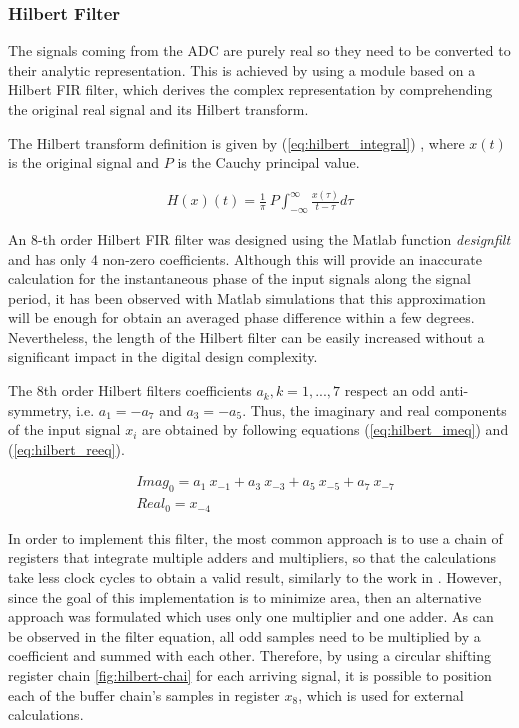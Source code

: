 \subsubsection{Hilbert Filter}

The signals coming from the ADC are purely real so they need to be converted to their analytic representation. This is achieved by using a module based on a Hilbert FIR filter, which derives the complex representation by comprehending the original real signal and its Hilbert transform. 

The Hilbert transform definition is given by (\ref{eq:hilbert_integral}) \cite{hilbert-def}, where $x(t)$ is the original signal and $P$ is the Cauchy principal value.

\begin{eqnarray}
	H(x)(t) = \frac{1}{\pi} \ P \int_{-\infty}^{\infty}\frac{x(\tau)}{t-\tau}d\tau
	\label{eq:hilbert_integral}
\end{eqnarray}

An 8-th order Hilbert FIR filter was designed using the Matlab function \textit{designfilt} and has only 4 non-zero coefficients. Although this will provide an inaccurate calculation for the instantaneous phase of the input signals along the signal period, it has been observed with Matlab simulations that this approximation will be enough for obtain an averaged phase difference within a few degrees. Nevertheless, the length of the Hilbert filter can be easily increased without a significant impact in the digital design complexity.

The 8th order Hilbert filters coefficients $a_k, k=1,...,7$ respect an odd anti-symmetry, i.e. $a_{1} = - a_{7}$ and $a_{3} = - a_{5}$. Thus, the imaginary and real components of the input signal $x_i$ are obtained by following equations (\ref{eq:hilbert_imeq}) and (\ref{eq:hilbert_reeq}). 

\begin{eqnarray}
	&Imag_0 = a_{1} \ x_{-1} +a_{3} \ x_{-3} + a_{5} \ x_{-5} + a_{7} \ x_{-7} \\
	\label{eq:hilbert_imeq}
	&Real_0 = x_{-4} 
	\label{eq:hilbert_reeq}
\end{eqnarray}

In order to implement this filter, the most common approach is to use a chain of registers that integrate multiple adders and multipliers, so that the calculations take less clock cycles to obtain a valid result, similarly to the work in \cite{hilbert-fpga}. However, since the goal of this implementation is to minimize area, then an alternative approach was formulated which uses only one multiplier and one adder. As can be observed in the filter equation, all odd samples need to be multiplied by a coefficient and summed with each other. Therefore, by using a circular shifting register chain \ref{fig:hilbert-chai} for each arriving signal, it is possible to position each of the buffer chain's samples in register $x_8$, which is used for external calculations.

